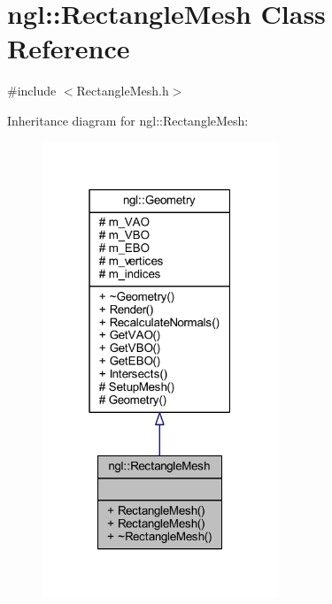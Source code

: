 \hypertarget{classngl_1_1_rectangle_mesh}{}\section{ngl\+:\+:Rectangle\+Mesh Class Reference}
\label{classngl_1_1_rectangle_mesh}


{\ttfamily \#include $<$Rectangle\+Mesh.\+h$>$}



Inheritance diagram for ngl\+:\+:Rectangle\+Mesh\+:
\nopagebreak
\begin{figure}[H]
\begin{center}
\leavevmode
\includegraphics[width=199pt]{classngl_1_1_rectangle_mesh__inherit__graph}
\end{center}
\end{figure}


